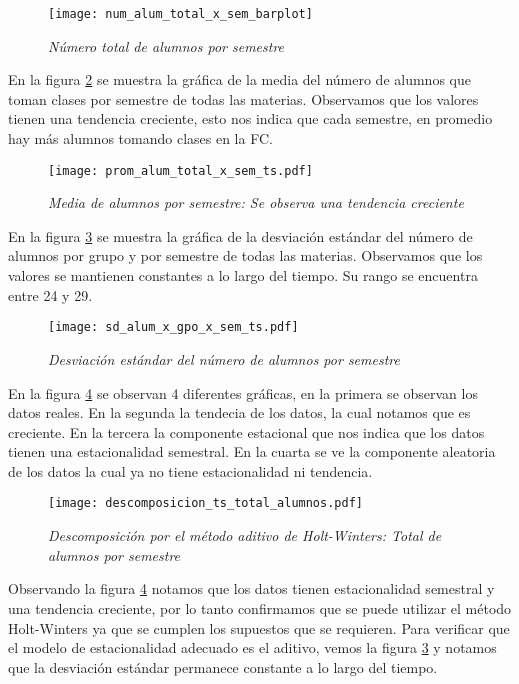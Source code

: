 \begin{figure}[H]
\centering
\texttt{[image: num\_alum\_total\_x\_sem\_barplot]} %
\caption{\textit{Número total de alumnos por semestre}}\label{TotalAlumBarras}
\end{figure}

En la figura \ref{prom_alum_x_sem_ts} se muestra la gráfica de la media del número de alumnos que toman clases por semestre de todas las materias. Observamos que los valores tienen una tendencia creciente, esto nos indica que cada semestre, en promedio hay más alumnos tomando clases en la FC.

\begin{figure}[H]
\centering
\texttt{[image: prom\_alum\_total\_x\_sem\_ts.pdf]} %
\caption[\textit{Media de alumnos por semestre}]{\textit{Media de alumnos por semestre: Se observa una tendencia creciente}}\label{prom_alum_x_sem_ts}
\end{figure}

En la figura \ref{sd_alum_x_gpo_x_sem_ts} se muestra la gráfica de la desviación estándar del número de alumnos por grupo y por semestre de todas las materias. Observamos que los valores se mantienen constantes a lo largo del tiempo. Su rango se encuentra entre 24 y 29.

\begin{figure}[H]
\centering
\texttt{[image: sd\_alum\_x\_gpo\_x\_sem\_ts.pdf]} %
\caption{\textit{Desviación estándar del número de alumnos por semestre}}\label{sd_alum_x_gpo_x_sem_ts}
\end{figure}

En la figura \ref{img_en_ing_2} se observan 4 diferentes gráficas, en la primera se observan los datos reales. En la segunda la tendecia de los datos, la cual notamos que es creciente. En la tercera la componente estacional que nos indica que los datos tienen una estacionalidad semestral. En la cuarta se ve la componente aleatoria de los datos la cual ya no tiene estacionalidad ni tendencia.

\begin{figure}[H]
\centering
\texttt{[image: descomposicion\_ts\_total\_alumnos.pdf]} %
\caption{\textit{Descomposición por el método aditivo de Holt-Winters: Total de alumnos por semestre}}\label{img_en_ing_2}
\end{figure}

Observando la figura \ref{img_en_ing_2} notamos que los datos tienen estacionalidad semestral y una tendencia creciente, por lo tanto confirmamos que se puede utilizar el método Holt-Winters ya que se cumplen los supuestos que se requieren. Para verificar que el modelo de estacionalidad adecuado es el aditivo, vemos la figura \ref{sd_alum_x_gpo_x_sem_ts} y notamos que la desviación estándar permanece constante a lo largo del tiempo.


